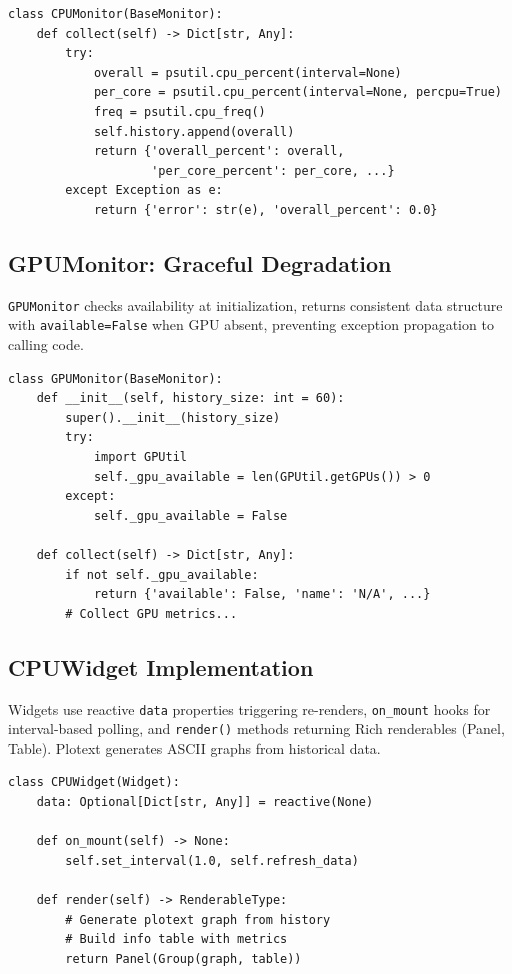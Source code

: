 \documentclass[12pt,a4paper,oneside]{report}
\begin{document}
\begin{lstlisting}
class CPUMonitor(BaseMonitor):
    def collect(self) -> Dict[str, Any]:
        try:
            overall = psutil.cpu_percent(interval=None)
            per_core = psutil.cpu_percent(interval=None, percpu=True)
            freq = psutil.cpu_freq()
            self.history.append(overall)
            return {'overall_percent': overall, 
                    'per_core_percent': per_core, ...}
        except Exception as e:
            return {'error': str(e), 'overall_percent': 0.0}
\end{lstlisting}

\subsection{GPUMonitor: Graceful Degradation}

\texttt{GPUMonitor} checks availability at initialization, returns consistent data structure with \texttt{available=False} when GPU absent, preventing exception propagation to calling code.

\begin{lstlisting}
class GPUMonitor(BaseMonitor):
    def __init__(self, history_size: int = 60):
        super().__init__(history_size)
        try:
            import GPUtil
            self._gpu_available = len(GPUtil.getGPUs()) > 0
        except:
            self._gpu_available = False
    
    def collect(self) -> Dict[str, Any]:
        if not self._gpu_available:
            return {'available': False, 'name': 'N/A', ...}
        # Collect GPU metrics...
\end{lstlisting}

\subsection{CPUWidget Implementation}

Widgets use reactive \texttt{data} properties triggering re-renders, \texttt{on\_mount} hooks for interval-based polling, and \texttt{render()} methods returning Rich renderables (Panel, Table). Plotext generates ASCII graphs from historical data.

\begin{lstlisting}
class CPUWidget(Widget):
    data: Optional[Dict[str, Any]] = reactive(None)
    
    def on_mount(self) -> None:
        self.set_interval(1.0, self.refresh_data)
    
    def render(self) -> RenderableType:
        # Generate plotext graph from history
        # Build info table with metrics
        return Panel(Group(graph, table))
\end{lstlisting}
\end{document}
